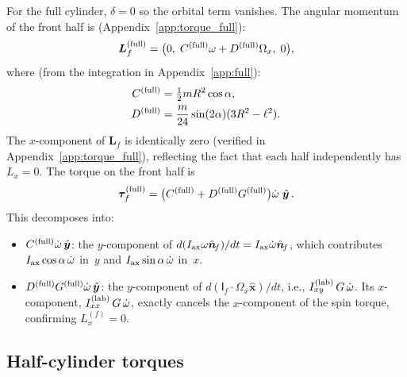 \documentclass[11pt]{article}
\newcommand{\vect}[1]{\bm{#1}}
\newcommand{\uv}[1]{\hat{\bm{#1}}}
\newcommand{\xhat}{\uv{x}}
\newcommand{\yhat}{\uv{y}}
\newcommand{\nf}{\uv{n}_{\!f}}
\begin{document}
For the full cylinder, $\delta=0$ so the orbital term vanishes.  The
angular momentum of the front half is (Appendix~\ref{app:torque_full}):
\begin{equation}
\vect{L}_f^{(\rm full)} = \bigl(0,\;C^{(\rm full)}\omega+D^{(\rm full)}\Omega_x,\;0\bigr),
\end{equation}
where (from the integration in Appendix~\ref{app:full}):
\begin{align}
C^{(\rm full)} &= \tfrac{1}{2}mR^2\cos\alpha, \label{eq:Cfull}\\
D^{(\rm full)} &= \frac{m}{24}\sin(2\alpha)(3R^2-\ell^2). \label{eq:Dfull}
\end{align}
The $x$-component of $\vect{L}_f$ is identically zero (verified in
Appendix~\ref{app:torque_full}), reflecting the fact that each half
independently has $L_x=0$.  The torque on the front half is
\begin{equation}\label{eq:tau_full}
\vect{\tau}_f^{(\rm full)}
= \bigl(C^{(\rm full)}+D^{(\rm full)}G^{(\rm full)}\bigr)\dot\omega\;\yhat\,.
\end{equation}
This decomposes into:
\begin{itemize}
\item $C^{(\rm full)}\dot\omega\,\yhat$: the $y$-component of
  $d(I_{\rm ax}\omega\nf)/dt = I_{\rm ax}\dot\omega\nf$, which
  contributes $I_{\rm ax}\cos\alpha\,\dot\omega$ in~$y$ and
  $I_{\rm ax}\sin\alpha\,\dot\omega$ in~$x$.
\item $D^{(\rm full)}G^{(\rm full)}\dot\omega\,\yhat$: the
  $y$-component of $d(\mathsf{I}_f\cdot\Omega_x\xhat)/dt$, i.e.,
  $I_{xy}^{(\rm lab)}\,G\,\dot\omega$.  Its $x$-component,
  $I_{xx}^{(\rm lab)}\,G\,\dot\omega$, exactly cancels the
  $x$-component of the spin torque, confirming $L_x^{(f)}=0$.
\end{itemize}

\subsection{Half-cylinder torques}
\end{document}
